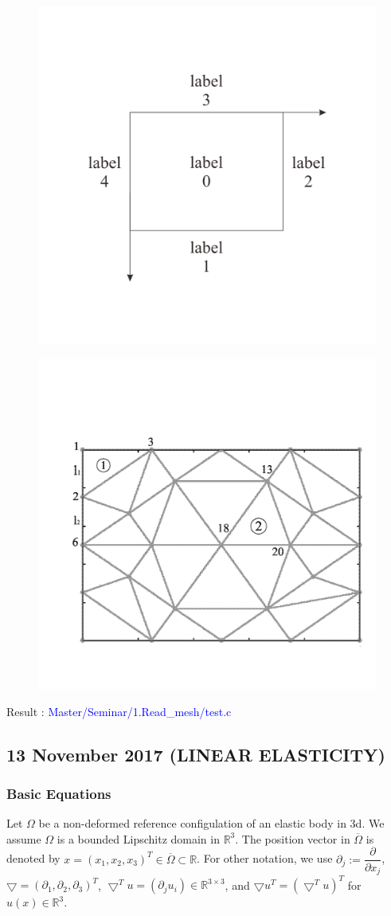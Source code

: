 \documentclass[a4paper,10pt]{article}
\begin{document}
\begin{figure}[h!]
	\centering
	\includegraphics[width=0.53\linewidth]{picture/labelPict}
	\caption{}
	\label{fig:labelpict}
\end{figure}
\begin{figure}[h!]
	\centering
	\includegraphics[width=0.7\linewidth]{picture/trianglePict}
	\caption{}
	\label{fig:trianglepict}
\end{figure}


Result : \textcolor{blue}{Master/Seminar/1.Read\_mesh/test.c}

\subsection{13 November 2017 (LINEAR ELASTICITY)}

\subsubsection{Basic Equations}
Let $ \Omega $ be a non-deformed reference configulation of an elastic body in 3d. We assume $ \Omega $ is a bounded Lipschitz domain in $ \mathbb{R}^{3} $. The position vector in $ \overline{\Omega} $ is denoted by $ x = (x_{1},x_{2},x_{3})^{T} \in \overline{\Omega} \subset \mathbb{R} $. For other notation, we use $ \partial_{j} := \dfrac{\partial}{\partial x_{j}} $, $ \bigtriangledown = (\partial_{1}, \partial_{2}, \partial_{3})^{T} $, $ \bigtriangledown^{T} u = (\partial_{j}u_{i}) \in \mathbb{R}^{3\times3} $, and $ \bigtriangledown u^{T} = (\bigtriangledown^{T} u)^{T}$ for $ u(x) \in \mathbb{R}^{3} $.
\end{document}
